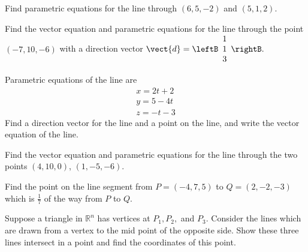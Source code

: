 \begin{enumialphparenastyle}
\begin{ex} Find parametric equations for the line through $\left( 6 , 5 , -2 \right) $ 
and $\left(5 , 1 , 2 \right) .$ 
\end{ex} 
 

\begin{ex} Find the vector equation and parametric equations for the line through the point $\left(
-7, 10 , -6 \right) $ with a direction vector $\vect{d} = \leftB
\begin{array}{r}
1 \\
1 \\
3
\end{array}
\rightB .$ \vspace{1mm}
\end{ex} 

\begin{ex} Parametric equations of the line are 
\begin{equation*}
\begin{array}{c}
x = 2t+2\\
y = 5-4t\\
z= -t-3
\end{array}
\end{equation*}
 Find a direction vector for the line and a point on the line, and write the 
vector equation of the line. 
\end{ex} 


\begin{ex} Find the vector equation and parametric equations for the line through the two points $\left(
4, 10, 0 \right) $, $\left( 1 , -5 , -6 \right) .$ 
\end{ex} 

\begin{ex} Find the point on the line segment from $P = \left(-4, 7, 5 \right) $
 to $Q = \left(2 , -2 , -3 \right) $ which is $\frac{1}{7}$ of the way from $P$ to $Q$.
\end{ex} 

\begin{ex} Suppose a triangle in $\mathbb{R}^{n}$  has vertices at $P_{1}, P_{2},$ and $P_{3}$. 
Consider the lines which are
drawn from a vertex to the mid point of the opposite side. Show these three
lines intersect in a point and find the coordinates of this point. 
\end{ex} 

\end{enumialphparenastyle}